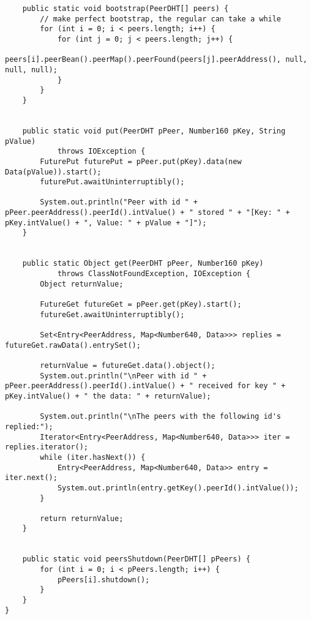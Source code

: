 \documentclass{article}
\begin{document}
\begin{lstlisting}
    public static void bootstrap(PeerDHT[] peers) {
        // make perfect bootstrap, the regular can take a while
        for (int i = 0; i < peers.length; i++) {
            for (int j = 0; j < peers.length; j++) {
                peers[i].peerBean().peerMap().peerFound(peers[j].peerAddress(), null, null, null);
            }
        }
    }

   
    public static void put(PeerDHT pPeer, Number160 pKey, String pValue)
            throws IOException {
        FuturePut futurePut = pPeer.put(pKey).data(new Data(pValue)).start();
        futurePut.awaitUninterruptibly();

        System.out.println("Peer with id " + pPeer.peerAddress().peerId().intValue() + " stored " + "[Key: " + pKey.intValue() + ", Value: " + pValue + "]");
    }

   
    public static Object get(PeerDHT pPeer, Number160 pKey)
            throws ClassNotFoundException, IOException {
        Object returnValue;

        FutureGet futureGet = pPeer.get(pKey).start();
        futureGet.awaitUninterruptibly();

        Set<Entry<PeerAddress, Map<Number640, Data>>> replies = futureGet.rawData().entrySet();

        returnValue = futureGet.data().object();
        System.out.println("\nPeer with id " + pPeer.peerAddress().peerId().intValue() + " received for key " + pKey.intValue() + " the data: " + returnValue);

        System.out.println("\nThe peers with the following id's replied:");
        Iterator<Entry<PeerAddress, Map<Number640, Data>>> iter = replies.iterator();
        while (iter.hasNext()) {
            Entry<PeerAddress, Map<Number640, Data>> entry = iter.next();
            System.out.println(entry.getKey().peerId().intValue());
        }

        return returnValue;
    }


    public static void peersShutdown(PeerDHT[] pPeers) {
        for (int i = 0; i < pPeers.length; i++) {
            pPeers[i].shutdown();
        }
    }
}
\end{lstlisting}
\end{document}
